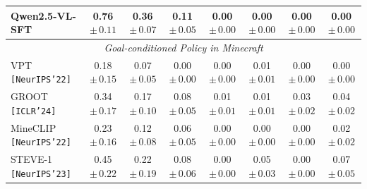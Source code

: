 \begin{table}[htbp]
{\begin{tabular}{lccccccc}
Qwen2.5-VL-SFT \cite{bai2025qwen2}    &  0.76$\scriptstyle\pm\,0.11$    & 0.36$\scriptstyle\pm\,0.07$      &   0.11$\scriptstyle\pm\,0.05$  &  0.00$\scriptstyle\pm\,0.00$    &   0.00$\scriptstyle\pm\,0.00$     &     0.00$\scriptstyle\pm\,0.00$    &   0.00$\scriptstyle\pm\,0.00$          \\
\hline
\multicolumn{8}{c}{\textit{Goal-conditioned Policy in Minecraft}} \\
\hline
VPT \cite{vpt}   \texttt{[NeurIPS'22]}   &  0.18$\scriptstyle\pm\,0.15$   &  0.07$\scriptstyle\pm\,0.05$    &   0.00$\scriptstyle\pm\,0.00$   &  0.00$\scriptstyle\pm\,0.00$    &   0.01$\scriptstyle\pm\,0.01$      &   0.00$\scriptstyle\pm\,0.00$       &   0.00$\scriptstyle\pm\,0.00$           \\
GROOT \cite{cai2023groot}   \texttt{[ICLR'24]}      &  0.34$\scriptstyle\pm\,0.17$   &  0.17$\scriptstyle\pm\,0.10$    &   0.08$\scriptstyle\pm\,0.05$   &  0.01$\scriptstyle\pm\,0.01$    &   0.01$\scriptstyle\pm\,0.01$      &   0.03$\scriptstyle\pm\,0.02$       &   0.04$\scriptstyle\pm\,0.02$           \\
MineCLIP \cite{fan2022minedojo}  \texttt{[NeurIPS'22]}      &  0.23$\scriptstyle\pm\,0.16$   &  0.12$\scriptstyle\pm\,0.08$    &   0.06$\scriptstyle\pm\,0.05$   &  0.00$\scriptstyle\pm\,0.00$    &   0.00$\scriptstyle\pm\,0.00$      &   0.00$\scriptstyle\pm\,0.00$       &   0.02$\scriptstyle\pm\,0.02$           \\
STEVE-1 \cite{lifshitz2024steve}    \texttt{[NeurIPS'23]}     &  0.45$\scriptstyle\pm\,0.22$   &  0.22$\scriptstyle\pm\,0.19$    &   0.08$\scriptstyle\pm\,0.06$   &  0.00$\scriptstyle\pm\,0.00$    &   0.05$\scriptstyle\pm\,0.03$      &   0.00$\scriptstyle\pm\,0.00$       &   0.07$\scriptstyle\pm\,0.05$           \\


\end{tabular}}
\end{table}
